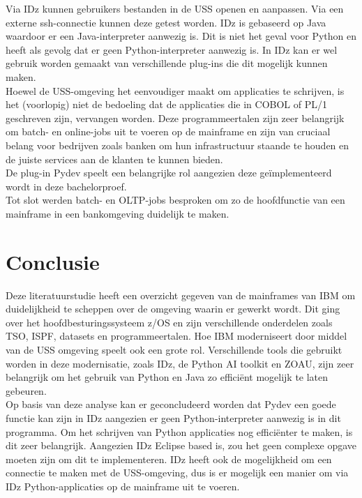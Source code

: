 Via IDz kunnen gebruikers bestanden in de USS openen en aanpassen. Via een externe ssh-connectie kunnen deze getest worden. IDz is gebaseerd op Java waardoor er een Java-interpreter aanwezig is. Dit is niet het geval voor Python en heeft als gevolg dat er geen Python-interpreter aanwezig is. In IDz kan er wel gebruik worden gemaakt van verschillende plug-ins die dit mogelijk kunnen maken. \\

Hoewel de USS-omgeving het eenvoudiger maakt om applicaties te schrijven, is het (voorlopig) niet de bedoeling dat de applicaties die in COBOL of PL/1 geschreven zijn, vervangen worden. Deze programmeertalen zijn zeer belangrijk om batch- en online-jobs uit te voeren op  de mainframe en zijn van cruciaal belang voor bedrijven zoals banken om hun infrastructuur staande te houden en de juiste services aan de klanten te kunnen bieden. \\

De plug-in Pydev speelt een belangrijke rol aangezien deze geïmplementeerd wordt in deze bachelorproef. \\

Tot slot werden batch- en OLTP-jobs besproken om zo de hoofdfunctie van een mainframe in een bankomgeving duidelijk te maken.\\

\newpage
\section{Conclusie}
Deze literatuurstudie heeft een overzicht gegeven van de mainframes van IBM om duidelijkheid te scheppen over de omgeving waarin er gewerkt wordt. Dit ging over het hoofdbesturingssysteem z/OS en zijn verschillende onderdelen zoals TSO, ISPF, datasets en programmeertalen. Hoe IBM moderniseert door middel van de USS omgeving speelt ook een grote rol. Verschillende tools die gebruikt worden in deze modernisatie, zoals IDz, de Python AI toolkit en ZOAU, zijn zeer belangrijk om het gebruik van Python en Java zo efficiënt mogelijk te laten gebeuren. \\

Op basis van deze analyse kan er geconcludeerd worden dat Pydev een goede functie kan zijn in IDz aangezien er geen Python-interpreter aanwezig is in dit programma. Om het schrijven van Python applicaties nog efficiënter te maken, is dit zeer belangrijk. Aangezien IDz Eclipse based is, zou het geen complexe opgave moeten zijn om dit te implementeren. IDz heeft ook de mogelijkheid om een connectie te maken met de USS-omgeving, dus is er mogelijk een manier om via IDz Python-applicaties op de mainframe uit te voeren. \\

